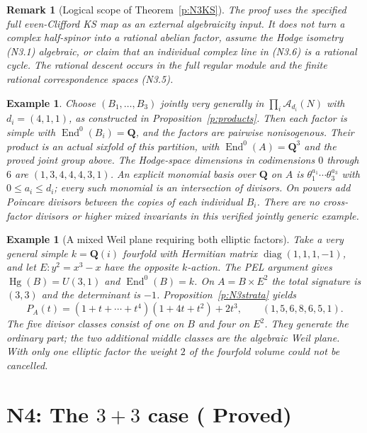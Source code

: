 \documentclass[10pt,reqno]{article}
\theoremstyle{emphasizedplain}
\DeclareRobustCommand{\provedstatus}{%
  \texorpdfstring{\textcolor{ProvedGreen}{\textbf{Proved}}}{Proved}}
\theoremstyle{emphasizeddefinition}
\newtheorem{example}[theorem]{Example}
\theoremstyle{emphasizeddefinition}
\newtheorem{remark}[theorem]{Remark}
\DeclareMathOperator{\End}{End}
\DeclareMathOperator{\Hg}{Hg}
\newcommand{\Q}{\mathbf Q}
\begin{document}
\begin{remark}[Logical scope of Theorem~\ref{p:N3KS}]
The proof uses the \emph{specified} full even-Clifford KS map as an
external algebraicity input. It does not turn a complex half-spinor
into a rational abelian factor, assume the Hodge isometry (N3.1)
algebraic, or claim that an individual complex line in (N3.6) is a
rational cycle. The rational descent occurs in the full regular module
and the finite rational correspondence spaces (N3.5).
\end{remark}
\begin{example}
Choose $(B_1,\ldots,B_{3})$ jointly very generally in
$\prod_i\mathcal A_{d_i}(N)$ with $d_i=(4,1,1)$,
as constructed in Proposition~\ref{p:products}. Then each factor is
simple with $\End^0(B_i)=\Q$, and the factors are pairwise nonisogenous.
Their product is an actual sixfold of this partition, with
$\End^0(A)=\Q^{3}$ and the proved joint group above.
The Hodge-space dimensions in codimensions $0$ through $6$ are
$(1,3,4,4,4,3,1)$.
An explicit monomial basis over $\Q$ on $A$ is
$\theta_1^{a_1}\cdots\theta_{3}^{a_{3}}$ with
$0\leq a_i\leq d_i$; every such monomial is an intersection of divisors.
On powers add Poincare divisors between the copies of each individual
$B_i$. There are no cross-factor divisors or higher mixed invariants in
this verified jointly generic example.
\end{example}
\begin{example}[A mixed Weil plane requiring both elliptic factors]
Take a very general simple $k=\Q(i)$ fourfold with Hermitian matrix
$\operatorname{diag}(1,1,1,-1)$, and let $E:y^2=x^3-x$ have the opposite
$k$-action. The PEL argument gives $\Hg(B)=U(3,1)$ and $\End^0(B)=k$.
On $A=B\times E^2$ the total signature is $(3,3)$ and the determinant
is $-1$. Proposition~\ref{p:N3strata} yields
\[
 P_A(t)=(1+t+\cdots+t^4)(1+4t+t^2)+2t^3,
 \qquad (1,5,6,8,6,5,1).
\]
The five divisor classes consist of one on $B$ and four on $E^2$.
They generate the ordinary part; the two additional middle classes
are the algebraic Weil plane. With only one elliptic factor the weight
$2$ of the fourfold volume could not be cancelled.
\end{example}
\section{N4: The \texorpdfstring{$3+3$}{3+3} case (\provedstatus)}\label{sec:N4}
\end{document}
